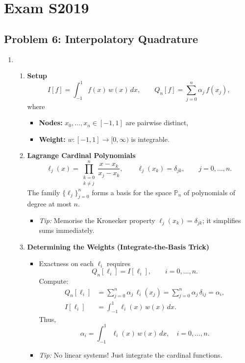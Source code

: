 \documentclass[a4paper,10pt]{article}
\begin{document}
\section{Exam S2019}

\subsection{Problem 6: Interpolatory Quadrature}

\begin{enumerate}[label=\textbf{\arabic*.}, leftmargin=*, itemsep=1em]
    \item
    \begin{enumerate}
        \item \textbf{Setup}
        \[
        I[f] = \int_{-1}^{1} f(x)\, w(x)\, dx, \qquad
        Q_n[f] = \sum_{j=0}^{n} \alpha_j\, f(x_j),
        \]
        where
        \begin{itemize}
            \item \textbf{Nodes:} \(x_0, \dots, x_n \in [-1,1]\) are pairwise distinct,
            \item \textbf{Weight:} \(w : [-1,1] \to [0, \infty)\) is integrable.
        \end{itemize}

        \item \textbf{Lagrange Cardinal Polynomials}
        \[
        \ell_j(x) = \prod_{\substack{k=0 \\ k \neq j}}^{n} \frac{x - x_k}{x_j - x_k},
        \qquad
        \ell_j(x_k) = \delta_{jk}, \qquad j = 0, \dots, n.
        \]
        The family \(\{\ell_j\}_{j=0}^{n}\) forms a basis for the space \(\mathbb{P}_n\) of polynomials of degree at most \(n\).
        \begin{itemize}
            \item \emph{Tip:} Memorise the Kronecker property \(\ell_j(x_k) = \delta_{jk}\); it simplifies sums immediately.
        \end{itemize}

        \item \textbf{Determining the Weights (Integrate-the-Basis Trick)}
        \begin{itemize}
            \item Exactness on each \(\ell_i\) requires
            \[
            Q_n[\ell_i] = I[\ell_i], \qquad i = 0, \dots, n.
            \]
            Compute:
            \begin{align*}
            Q_n[\ell_i]
                &= \sum_{j=0}^{n} \alpha_j\, \ell_i(x_j)
                 = \sum_{j=0}^{n} \alpha_j\, \delta_{ij}
                 = \alpha_i,  \\
            I[\ell_i]
                &= \int_{-1}^{1} \ell_i(x)\, w(x)\, dx.
            \end{align*}
            Thus,
            \[
            \boxed{
            \alpha_i = \int_{-1}^{1} \ell_i(x)\, w(x)\, dx,
            \quad i = 0, \dots, n.
            }
            \]
            \item \emph{Tip:} No linear systems! Just integrate the cardinal functions.
        \end{itemize}


\end{enumerate}
\end{enumerate}
\end{document}
